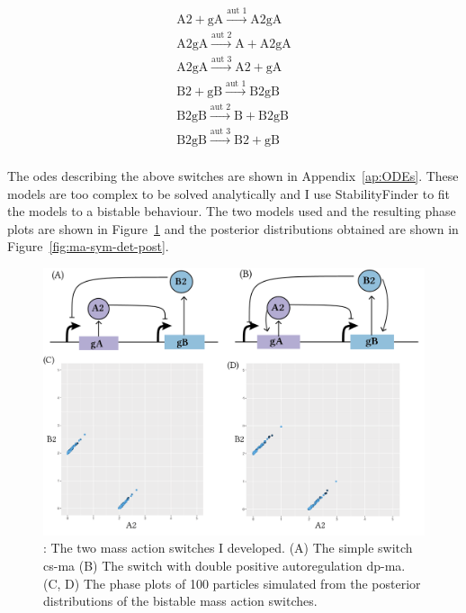 $$
\begin{array}{cccc} 
    \textrm{A2} + \textrm{gA} \stackrel{\textrm{aut 1}}{\longrightarrow} \textrm{A2gA} \\
    \textrm{A2gA} \stackrel{\textrm{aut 2}}{\longrightarrow} \textrm{A} + \textrm{A2gA}\\
    \textrm{A2gA} \stackrel{\textrm{aut 3}}{\longrightarrow} \textrm{A2}+ \textrm{gA}  \\
    \textrm{B2} + \textrm{gB} \stackrel{\textrm{aut 1}}{\longrightarrow} \textrm{B2gB} \\
    \textrm{B2gB} \stackrel{\textrm{aut 2}}{\longrightarrow} \textrm{B} + \textrm{B2gB}\\
    \textrm{B2gB} \stackrel{\textrm{aut 3}}{\longrightarrow} \textrm{B2}+ \textrm{gB}  \\
\end{array}
$$

The \acrshort{ode}s describing the above switches are shown in Appendix~\ref{ap:ODEs}. These models are too complex to be solved analytically and I use StabilityFinder to fit the models to a bistable behaviour. The two models used and the resulting phase plots are shown in Figure~\ref{fig:ma-cs-dp-phase} and the posterior distributions  obtained are shown in Figure~\ref{fig:ma-sym-det-post}. 

\begin{figure}[htbp]
\begin{center}
\includegraphics[scale=0.7]{../../chapters/chapterStabilityFinder/images/MA-cs-dp-phase.png}
\caption[The mass action togge switches and phase plots]{ \label{fig:ma-cs-dp-phase}: The two mass action switches I developed. (A) The simple switch \acrshort{cs-ma} (B) The switch with double positive autoregulation \acrshort{dp-ma}. (C, D) The phase plots of 100 particles simulated from the posterior distributions of the bistable mass action switches.}
\end{center}
\end{figure}


